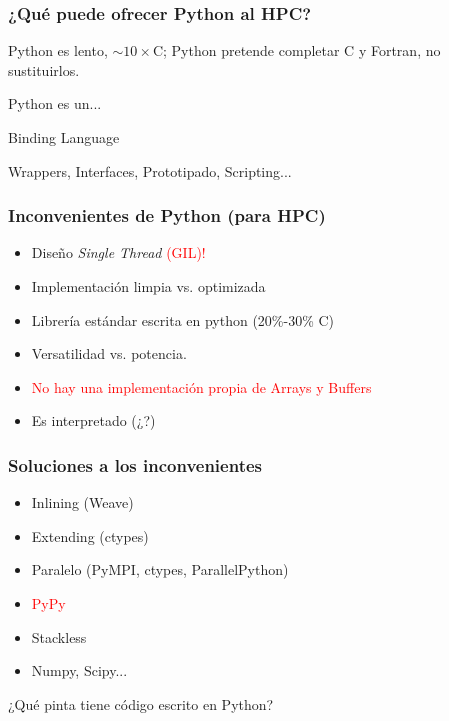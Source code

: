 \documentclass{beamer}
\begin{document}
\begin{frame}
 \frametitle{¿Qué puede ofrecer Python al HPC?}
Python es lento, $\sim 10 \times$C; Python pretende completar C y Fortran, no sustituirlos.
\vspace{1cm}
\begin{center}
Python es un...\\
\vspace{1cm}
 \begin{Huge}
  Binding Language
 \end{Huge} 
\end{center}
Wrappers, Interfaces, Prototipado, Scripting...
\end{frame}


\begin{frame}
 \frametitle{Inconvenientes de Python (para HPC)}
\begin{itemize}
 \item Diseño \emph{Single Thread} \textcolor{red}{(GIL)!}
 \item Implementación limpia vs. optimizada
 \item Librería estándar escrita en python (20\%-30\%  C)
 \item Versatilidad vs. potencia.
 \item \textcolor{red}{No hay una implementación propia de Arrays y Buffers}
 \item Es interpretado (¿?)
\end{itemize}
\end{frame}

\begin{frame}
 \frametitle{Soluciones a los inconvenientes}
\begin{itemize}
 \item Inlining (Weave)
 \item Extending (ctypes)
 \item Paralelo (PyMPI, ctypes, ParallelPython)
 \item \textcolor{red}{PyPy}
 \item Stackless
 \item Numpy, Scipy...
\end{itemize}
\end{frame}

\begin{frame}
\begin{center}
\begin{LARGE}
¿Qué pinta tiene código escrito en Python?
\end{LARGE} 
\end{center}
\end{frame}
\end{document}
